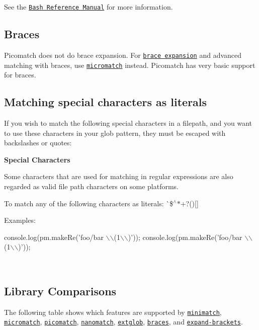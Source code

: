 See the \href{https://www.gnu.org/software/bash/manual/html_node/Pattern-Matching.html}{\tt Bash Reference Manual} for more information.

\subsection*{Braces}

Picomatch does not do brace expansion. For \href{https://www.gnu.org/software/bash/manual/html_node/Brace-Expansion.html}{\tt brace expansion} and advanced matching with braces, use \href{https://github.com/micromatch/micromatch}{\tt micromatch} instead. Picomatch has very basic support for braces.

\subsection*{Matching special characters as literals}

If you wish to match the following special characters in a filepath, and you want to use these characters in your glob pattern, they must be escaped with backslashes or quotes\+:

{\bfseries Special Characters}

Some characters that are used for matching in regular expressions are also regarded as valid file path characters on some platforms.

To match any of the following characters as literals\+: \`{}\$$^\wedge$$\ast$+?()\mbox{[}\mbox{]}

Examples\+:


\begin{DoxyCode}
console.log(pm.makeRe('foo/bar \(\backslash\)\(\backslash\)(1\(\backslash\)\(\backslash\))'));
console.log(pm.makeRe('foo/bar \(\backslash\)\(\backslash\)(1\(\backslash\)\(\backslash\))'));
\end{DoxyCode}


~\newline
 ~\newline


\subsection*{Library Comparisons}

The following table shows which features are supported by \href{https://github.com/isaacs/minimatch}{\tt minimatch}, \href{https://github.com/micromatch/micromatch}{\tt micromatch}, \href{https://github.com/micromatch/picomatch}{\tt picomatch}, \href{https://github.com/micromatch/nanomatch}{\tt nanomatch}, \href{https://github.com/micromatch/extglob}{\tt extglob}, \href{https://github.com/micromatch/braces}{\tt braces}, and \href{https://github.com/micromatch/expand-brackets}{\tt expand-\/brackets}.

